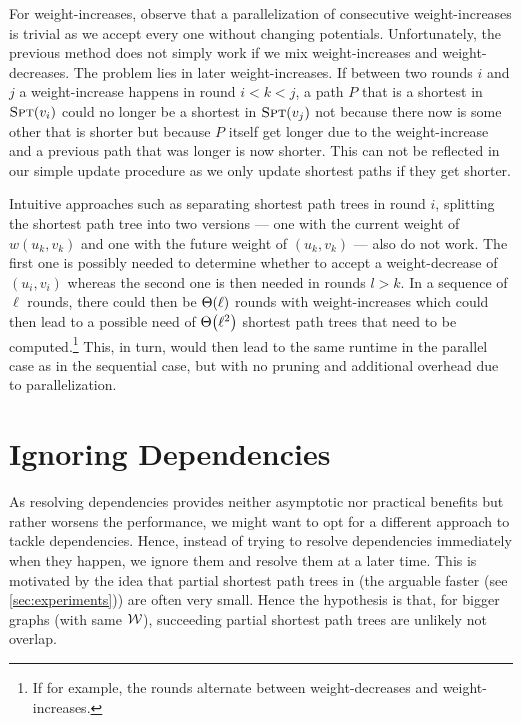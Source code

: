\bigskip

For weight-increases, observe that a parallelization of consecutive weight-increases is trivial as we accept every one without changing potentials.
Unfortunately, the previous method does not simply work if we mix weight-increases and weight-decreases.
The problem lies in later weight-increases.
If between two rounds $i$ and $j$ a weight-increase happens in round $i < k < j$, a path $P$ that is a shortest  in $\textsc{Spt}(v_i)$ could no longer be a shortest  in $\textsc{Spt}(v_j)$ not because there now is some other  that is shorter but because $P$ itself get longer due to the weight-increase and a previous path that was longer is now shorter.
This can not be reflected in our simple update procedure as we only update shortest paths if they get shorter.

Intuitive approaches such as separating shortest path trees in round $i$, \ie splitting the shortest path tree into two versions --- one with the current weight of $w(u_k,v_k)$ and one with the future weight of $(u_k,v_k)$ --- also do not work.
The first one is possibly needed to determine whether to accept a weight-decrease of $(u_i,v_i)$ whereas the second one is then needed in rounds $l > k$.
In a sequence of $\ell$ rounds, there could then be $\Theta\!\left(\ell\right)$ rounds with weight-increases which could then lead to a possible need of $\Theta\!\left(\ell^2\right)$ shortest path trees that need to be computed.\footnote{
    If for example, the rounds alternate between weight-decreases and weight-increases.
}
This, in turn, would then lead to the same runtime in the parallel case as in the sequential case, but with no pruning and additional overhead due to parallelization.


\section{Ignoring Dependencies}
As resolving dependencies provides neither asymptotic nor practical benefits but rather worsens the performance, we might want to opt for a different approach to tackle dependencies.
Hence, instead of trying to resolve dependencies immediately when they happen, we ignore them and resolve them at a later time.
This is motivated by the idea that partial shortest path trees in (the arguable faster (see \cref{sec:experiments})) \algbp are often very small.
Hence the hypothesis is that, for bigger graphs (with same $\mathcal W$), succeeding partial shortest path trees are unlikely not overlap. 

